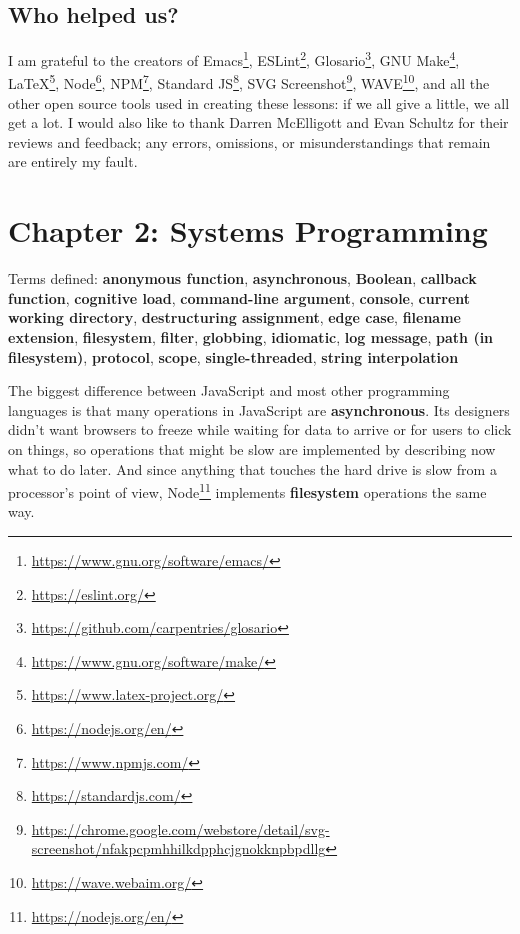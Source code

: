 \documentclass[krantzl]{krantz}
\newcommand{\glossref}[1]{\textbf{#1}}
\newcommand{\hreffoot}[2]{{#1}\footnote{\href{#2}{#2}}}
\begin{document}
\section{Who helped us?}\label{introduction-help}


I am grateful to the creators of \hreffoot{Emacs}{https://www.gnu.org/software/emacs/},
\hreffoot{ESLint}{https://eslint.org/},
\hreffoot{Glosario}{https://github.com/carpentries/glosario},
\hreffoot{GNU Make}{https://www.gnu.org/software/make/},
\hreffoot{LaTeX}{https://www.latex-project.org/},
\hreffoot{Node}{https://nodejs.org/en/},
\hreffoot{NPM}{https://www.npmjs.com/},
\hreffoot{Standard JS}{https://standardjs.com/},
\hreffoot{SVG Screenshot}{https://chrome.google.com/webstore/detail/svg-screenshot/nfakpcpmhhilkdpphcjgnokknpbpdllg},
\hreffoot{WAVE}{https://wave.webaim.org/},
and all the other open source tools used in creating these lessons:
if we all give a little,
we all get a lot.
I would also like to thank Darren McElligott and Evan Schultz
for their reviews and feedback;
any errors, omissions, or misunderstandings that remain are entirely my fault.

\chapter{Chapter 2: Systems Programming}\label{systems-programming}


\noindent 
    Terms defined:
    \glossref{anonymous function}, \glossref{asynchronous}, \glossref{Boolean}, \glossref{callback function}, \glossref{cognitive load}, \glossref{command-line argument}, \glossref{console}, \glossref{current working directory}, \glossref{destructuring assignment}, \glossref{edge case}, \glossref{filename extension}, \glossref{filesystem}, \glossref{filter}, \glossref{globbing}, \glossref{idiomatic}, \glossref{log message}, \glossref{path (in filesystem)}, \glossref{protocol}, \glossref{scope}, \glossref{single-threaded}, \glossref{string interpolation}



The biggest difference between JavaScript and most other programming languages
is that many operations in JavaScript are \glossref{asynchronous}.
Its designers didn't want browsers to freeze while waiting for data to arrive or for users to click on things,
so operations that might be slow are implemented by describing now what to do later.
And since anything that touches the hard drive is slow from a processor's point of view,
\hreffoot{Node}{https://nodejs.org/en/} implements \glossref{filesystem} operations the same way.
\end{document}
